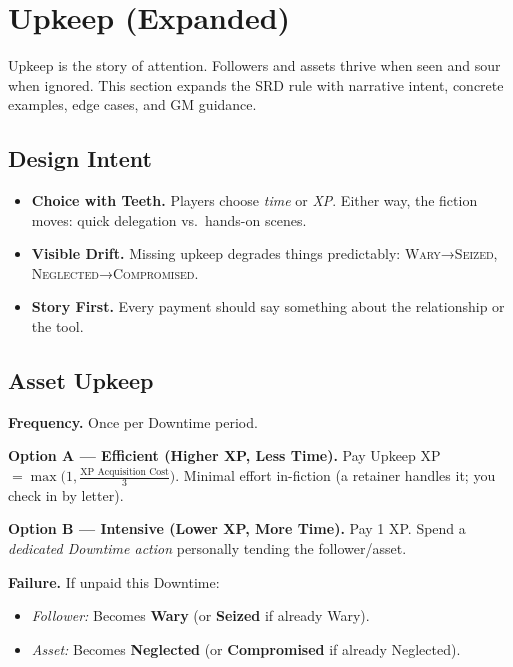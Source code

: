 
\section{Upkeep (Expanded)}\label{sec:upkeep-expanded}

Upkeep is the story of attention. Followers and assets thrive when seen and sour when ignored. This section expands the SRD rule with narrative intent, concrete examples, edge cases, and GM guidance.

\subsection{Design Intent}\label{subsec:upkeep-intent}
\begin{itemize}
\item \textbf{Choice with Teeth.} Players choose \emph{time} or \emph{XP}. Either way, the fiction moves: quick delegation vs.\ hands-on scenes.
\item \textbf{Visible Drift.} Missing upkeep degrades things predictably: \textsc{Wary}→\textsc{Seized}, \textsc{Neglected}→\textsc{Compromised}.
\item \textbf{Story First.} Every payment should say something about the relationship or the tool.
\end{itemize}

\subsection{Asset Upkeep}\label{subsec:upkeep-core}
\textbf{Frequency.} Once per Downtime period.\par
\textbf{Option A — Efficient (Higher XP, Less Time).} Pay Upkeep XP $= \max\big(1, \tfrac{\text{XP Acquisition Cost}}{3}\big)$. Minimal effort in-fiction (a retainer handles it; you check in by letter).\par
\textbf{Option B — Intensive (Lower XP, More Time).} Pay 1 XP. Spend a \emph{dedicated Downtime action} personally tending the follower/asset.

\textbf{Failure.} If unpaid this Downtime:
\begin{itemize}
\item \emph{Follower:} Becomes \textbf{Wary} (or \textbf{Seized} if already Wary).
\item \emph{Asset:} Becomes \textbf{Neglected} (or \textbf{Compromised} if already Neglected).
\end{itemize}

